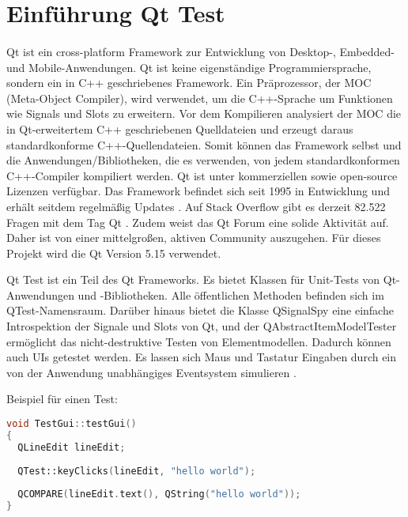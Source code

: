 		\section{Einführung Qt Test}
		\paragraph{} Qt ist ein cross-platform Framework zur Entwicklung von Desktop-, Embedded- und Mobile-Anwendungen. Qt ist keine eigenständige Programmiersprache, sondern ein in C++ geschriebenes Framework. Ein Präprozessor, der MOC (Meta-Object Compiler), wird verwendet, um die C++-Sprache um Funktionen wie Signals und Slots zu erweitern. Vor dem Kompilieren analysiert der MOC die in Qt-erweitertem C++ geschriebenen Quelldateien und erzeugt daraus standardkonforme C++-Quellendateien. Somit können das Framework selbst und die Anwendungen/Bibliotheken, die es verwenden, von jedem standardkonformen C++-Compiler kompiliert werden. Qt ist unter kommerziellen sowie open-source Lizenzen verfügbar. Das Framework befindet sich seit 1995 in Entwicklung und erhält seitdem regelmäßig Updates \cite{QtWiki}. Auf Stack Overflow gibt es derzeit 82.522 Fragen mit dem Tag Qt \cite{QtQuestions}. Zudem weist das Qt Forum eine solide Aktivität auf. Daher ist von einer mittelgroßen, aktiven Community auszugehen. Für dieses Projekt wird die Qt Version 5.15 verwendet. 
				
		Qt Test ist ein Teil des Qt Frameworks. Es bietet Klassen für Unit-Tests von Qt-Anwendungen und -Bibliotheken. Alle öffentlichen Methoden befinden sich im QTest-Namensraum. Darüber hinaus bietet die Klasse QSignalSpy eine einfache Introspektion der Signale und Slots von Qt, und der QAbstractItemModelTester ermöglicht das nicht-destruktive Testen von Elementmodellen. Dadurch können auch UIs getestet werden. Es lassen sich Maus und Tastatur Eingaben durch ein von der Anwendung unabhängiges Eventsystem simulieren \cite{documentationQt}.
		
		Beispiel für einen Test:
		\begin{lstlisting}[language=C++, caption=Hello World Beispiel]
void TestGui::testGui()
{
  QLineEdit lineEdit;
	
  QTest::keyClicks(lineEdit, "hello world");
		
  QCOMPARE(lineEdit.text(), QString("hello world"));
}
		\end{lstlisting}
